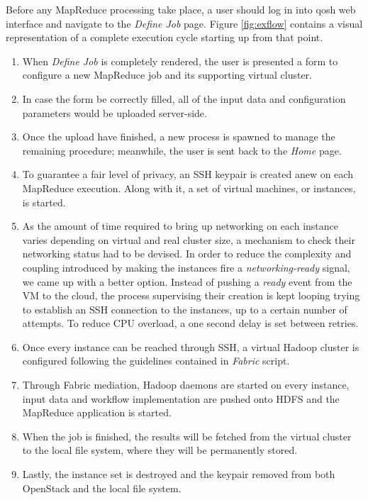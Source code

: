 \documentclass[conference]{IEEEtran}
\begin{document}
\noindent Before any MapReduce processing take place, a user should log in into qosh web interface and navigate to the \emph{Define Job} page. Figure \ref{fig:exflow} contains a visual representation of a complete execution cycle starting up from that point.

\begin{enumerate}
 \item When \emph{Define Job} is completely rendered, the user is presented a form to configure a new MapReduce job and its supporting virtual cluster.
 
 \item In case the form be correctly filled, all of the input data and configuration parameters would be uploaded server-side.
 
 \item Once the upload have finished, a new process is spawned to manage the remaining procedure; meanwhile, the user is sent back to the \emph{Home} page.
 
 \item To guarantee a fair level of privacy, an SSH keypair is created anew on each MapReduce execution. Along with it, a set of virtual machines, or instances, is started.
 
 \item As the amount of time required to bring up networking on each instance varies depending on virtual and real cluster size, a mechanism to check their networking status had to be devised. In order to reduce the complexity and coupling introduced by making the instances fire a \emph{networking-ready} signal, we came up with a better option. Instead of pushing a \emph{ready} event from the VM to the cloud, the process supervising their creation is kept looping trying to establish an SSH connection to the instances, up to a certain number of attempts. To reduce CPU overload, a one second delay is set between retries.
 
 \item Once every instance can be reached through SSH, a virtual Hadoop cluster is configured following the guidelines contained in \emph{Fabric} script.
 
 \item Through Fabric mediation, Hadoop daemons are started on every instance, input data and workflow implementation are pushed onto HDFS and the MapReduce application is started.
 
 \item When the job is finished, the results will be fetched from the virtual cluster to the local file system, where they will be permanently stored.
 
 \item Lastly, the instance set is destroyed and the keypair removed from both OpenStack and the local file system.
\end{enumerate}
\end{document}
